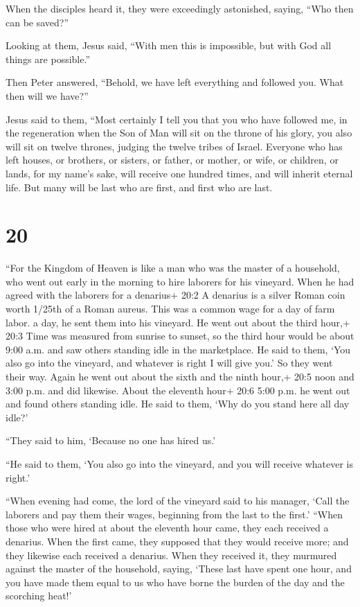  When the disciples heard it, they were exceedingly
astonished, saying, ``Who then can be saved?''

 Looking at them, Jesus said, ``With men this is
impossible, but with God all things are possible.''

 Then Peter answered, ``Behold, we have left everything and
followed you. What then will we have?''

 Jesus said to them, ``Most certainly I tell you that you
who have followed me, in the regeneration when the Son of Man will sit
on the throne of his glory, you also will sit on twelve thrones, judging
the twelve tribes of Israel.  Everyone who has left houses,
or brothers, or sisters, or father, or mother, or wife, or children, or
lands, for my name's sake, will receive one hundred times, and will
inherit eternal life.  But many will be last who are first,
and first who are last.

\hypertarget{section-19}{%
\section{20}\label{section-19}}

 ``For the Kingdom of Heaven is like a man who was the
master of a household, who went out early in the morning to hire
laborers for his vineyard.  When he had agreed with the
laborers for a denarius+ 20:2 A denarius is a silver Roman coin worth
1/25th of a Roman aureus. This was a common wage for a day of farm
labor. a day, he sent them into his vineyard.  He went out
about the third hour,+ 20:3 Time was measured from sunrise to sunset, so
the third hour would be about 9:00 a.m. and saw others standing idle in
the marketplace.  He said to them, `You also go into the
vineyard, and whatever is right I will give you.' So they went their
way.  Again he went out about the sixth and the ninth hour,+
20:5 noon and 3:00 p.m. and did likewise.  About the
eleventh hour+ 20:6 5:00 p.m. he went out and found others standing
idle. He said to them, `Why do you stand here all day idle?'

 ``They said to him, `Because no one has hired us.'

``He said to them, `You also go into the vineyard, and you will receive
whatever is right.'

 ``When evening had come, the lord of the vineyard said to
his manager, `Call the laborers and pay them their wages, beginning from
the last to the first.'  ``When those who were hired at
about the eleventh hour came, they each received a denarius.
 When the first came, they supposed that they would receive
more; and they likewise each received a denarius.  When
they received it, they murmured against the master of the household,
 saying, `These last have spent one hour, and you have made
them equal to us who have borne the burden of the day and the scorching
heat!'

